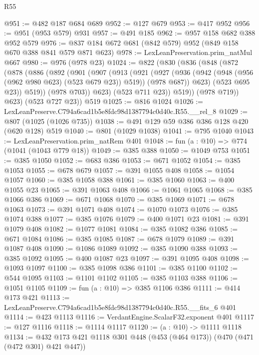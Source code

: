 \begin{lexlean}{R55}
\begin{coremodule}
@951 := @482 @187 @684 @689
@952 := @127 @679
@953 := @417 @952
@956 := @951 (@953 @579) @931
@957 := @491 @185
@962 := @957 @158 @682 @388 @952 @579
@976 := @837 @184 @672 @681 (@842 @579) @952 (@849 @158 @670 @388 @841 @579 @871 @623)
@978 := LexLeanPreservation.prim_natMul @667
@980 := @976 (@978 @23)
@1024 := @822
    (@830
      (@836
        (@848
          (@872
            (@878
              (@886
                (@892
                  (@901
                    (@907
                      (@913
                        (@921
                          (@927
                            (@936
                              (@942 (@948 (@956 (@962 @980 @623) (@523 @679 @23)) @519))
                              (@978 @687))
                            @623)
                          (@523 @695 @23))
                        @519))
                    (@978 @703))
                  @623)
                (@523 @711 @23))
              @519))
          (@978 @719))
        @623)
      (@523 @727 @23))
    @519
@1025 := @816 @1024
@1026 := LexLeanPreserve.C794a6cad1b5e8fdc98d1387794c0d40c.R55.__rel_8
@1029 := @807 (@1025 (@1026 @735))
@1038 := @491 @129 @59 @386 @386 @128 @420 (@620 @128) @519
@1040 := @801 (@1029 @1038)
@1041 := @795 @1040
@1043 := LexLeanPreservation.prim_natRem @401
@1048 := fun (a : @10) => @774 (@1041 (@1043 @779 @18))
@1049 := @385 @388
@1050 := @1049 @753
@1051 := @385 @1050
@1052 := @683 @386
@1053 := @671 @1052
@1054 := @385 @1053
@1055 := @678 @679
@1057 := @391 @1055 @408
@1058 := @1054 @1057
@1060 := @385 @1058 @388
@1061 := @385 @1060
@1063 := @400 @1055 @23
@1065 := @391 @1063 @408
@1066 := @1061 @1065
@1068 := @385 @1066 @386
@1069 := @671 @1068
@1070 := @385 @1069
@1071 := @678 @1063
@1073 := @391 @1071 @408
@1074 := @1070 @1073
@1076 := @385 @1074 @388
@1077 := @385 @1076
@1079 := @400 @1071 @23
@1081 := @391 @1079 @408
@1082 := @1077 @1081
@1084 := @385 @1082 @386
@1085 := @671 @1084
@1086 := @385 @1085
@1087 := @678 @1079
@1089 := @391 @1087 @408
@1090 := @1086 @1089
@1092 := @385 @1090 @388
@1093 := @385 @1092
@1095 := @400 @1087 @23
@1097 := @391 @1095 @408
@1098 := @1093 @1097
@1100 := @385 @1098 @386
@1101 := @385 @1100
@1102 := @544 @1095
@1103 := @1101 @1102
@1105 := @385 @1103 @388
@1106 := @1051 @1105
@1109 := fun (a : @10) => @385 @1106 @386
@1111 := @414 @173 @421
@1113 := LexLeanPreserve.C794a6cad1b5e8fdc98d1387794c0d40c.R55.__fits_6 @401
@1114 := @423 @1113
@1116 := VerdantEngine.ScalarF32.exponent @401
@1117 := @127 @1116
@1118 := @1114 @1117
@1120 := (a : @10) -> @1111 @1118
@1134 := @432 @173 @421 @1118 @301 @448 (@453 (@464 @173)) (@470 (@471 (@472 @301) @421 @447))

\end{coremodule}
\end{lexlean}
